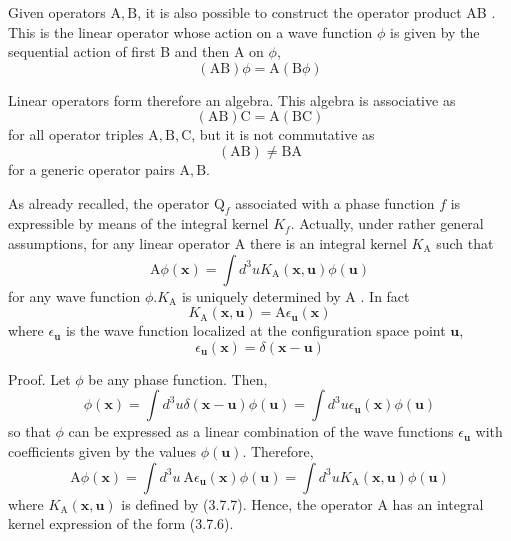 \documentclass{article}
\begin{document}
Given operators $\mathrm{A}, \mathrm{B}$, it is also possible to construct the operator product AB . This is the linear operator whose action on a wave function $\phi$ is given by the sequential action of first B and then A on $\phi$,
$$
\begin{equation*}
(\mathrm{AB}) \phi=\mathrm{A}(\mathrm{B} \phi) \tag{3.7.3}
\end{equation*}
$$

Linear operators form therefore an algebra. This algebra is associative as
$$
\begin{equation*}
(\mathrm{AB}) \mathrm{C}=\mathrm{A}(\mathrm{BC}) \tag{3.7.4}
\end{equation*}
$$
for all operator triples $\mathrm{A}, \mathrm{B}, \mathrm{C}$, but it is not commutative as
$$
\begin{equation*}
(\mathrm{AB}) \neq \mathrm{BA} \tag{3.7.5}
\end{equation*}
$$
for a generic operator pairs $\mathrm{A}, \mathrm{B}$.

As already recalled, the operator $\mathrm{Q}_{f}$ associated with a phase function $f$ is expressible by means of the integral kernel $K_{f}$. Actually, under rather general assumptions, for any linear operator A there is an integral kernel $K_{\mathrm{A}}$ such that
$$
\begin{equation*}
\mathrm{A} \phi(\boldsymbol{x})=\int d^{3} u K_{\mathrm{A}}(\boldsymbol{x}, \boldsymbol{u}) \phi(\boldsymbol{u}) \tag{3.7.6}
\end{equation*}
$$
for any wave function $\phi . K_{\mathrm{A}}$ is uniquely determined by A . In fact
$$
\begin{equation*}
K_{\mathrm{A}}(\boldsymbol{x}, \boldsymbol{u})=\mathrm{A} \epsilon_{\boldsymbol{u}}(\boldsymbol{x}) \tag{3.7.7}
\end{equation*}
$$
where $\epsilon_{\boldsymbol{u}}$ is the wave function localized at the configuration space point $\boldsymbol{u}$,
$$
\begin{equation*}
\epsilon_{\boldsymbol{u}}(\boldsymbol{x})=\delta(\boldsymbol{x}-\boldsymbol{u}) \tag{3.7.8}
\end{equation*}
$$

Proof. Let $\phi$ be any phase function. Then,
$$
\begin{equation*}
\phi(\boldsymbol{x})=\int d^{3} u \delta(\boldsymbol{x}-\boldsymbol{u}) \phi(\boldsymbol{u})=\int d^{3} u \epsilon_{\boldsymbol{u}}(\boldsymbol{x}) \phi(\boldsymbol{u}) \tag{3.7.9}
\end{equation*}
$$
so that $\phi$ can be expressed as a linear combination of the wave functions $\epsilon_{\boldsymbol{u}}$ with coefficients given by the values $\phi(\boldsymbol{u})$. Therefore,
$$
\begin{equation*}
\mathrm{A} \phi(\boldsymbol{x})=\int d^{3} u \mathrm{~A} \epsilon_{\boldsymbol{u}}(\boldsymbol{x}) \phi(\boldsymbol{u})=\int d^{3} u K_{\mathrm{A}}(\boldsymbol{x}, \boldsymbol{u}) \phi(\boldsymbol{u}) \tag{3.7.10}
\end{equation*}
$$
where $K_{\mathrm{A}}(\boldsymbol{x}, \boldsymbol{u})$ is defined by (3.7.7). Hence, the operator A has an integral kernel expression of the form (3.7.6).
\end{document}
